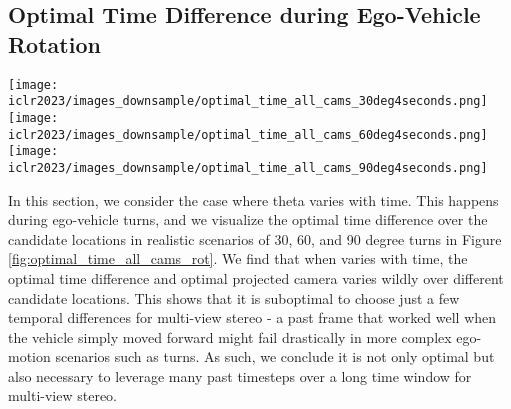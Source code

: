\documentclass[runningheads, hyperfootnotes=false]{article}
\begin{document}
\subsection{Optimal Time Difference during Ego-Vehicle Rotation}\label{app:theory_turns}
\begin{figure*}[t]
  \centering
  \texttt{[image: iclr2023/images\_downsample/optimal\_time\_all\_cams\_30deg4seconds.png]}
  \texttt{[image: iclr2023/images\_downsample/optimal\_time\_all\_cams\_60deg4seconds.png]}
  \texttt{[image: iclr2023/images\_downsample/optimal\_time\_all\_cams\_90deg4seconds.png]}
  \captionsetup{aboveskip=0pt}\captionsetup{belowskip=0pt}\caption{Visualization of the optimal time difference for every candidate location when the ego-vehicle turns 30, 60, or 90 degrees over the first 8 timesteps.}
  \label{fig:optimal_time_all_cams_rot}
\end{figure*} In this section, we consider the case where theta varies with time. This happens during ego-vehicle turns, and we visualize the optimal time difference over the candidate locations in realistic scenarios of 30, 60, and 90 degree turns in Figure \ref{fig:optimal_time_all_cams_rot}. We find that when  varies with time, the optimal time difference and optimal projected camera varies wildly over different candidate locations. This shows that it is suboptimal to choose just a few temporal differences for multi-view stereo - a past frame that worked well when the vehicle simply moved forward might fail drastically in more complex ego-motion scenarios such as turns. As such, we conclude it is not only optimal but also necessary to leverage many past timesteps over a long time window for multi-view stereo.
\end{document}
